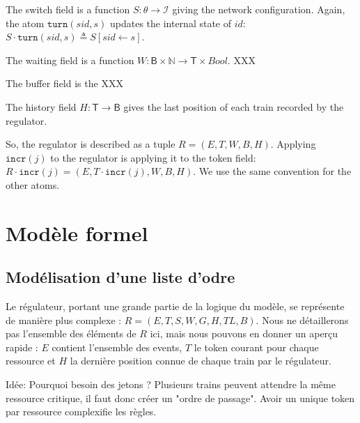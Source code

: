 \documentclass[runningheads]{llncs}
\newcommand{\Nat}{{\mbox{$\mathbb{N}$}}}
\newcommand{\turnouts}{{\mathsf{\theta}}}
\newcommand{\blocks}{{\mathsf{B}}}
\newcommand{\internalState}{{\mathcal{I}}}
\newcommand{\incr}{{\mbox{$\mathtt{incr}$}}\xspace}
\newcommand{\turn}{{\mbox{$\mathtt{turn}$}}\xspace}
\newcommand{\trains}{{\mathsf{T}}}
\begin{document}
The switch field is a function $S: \turnouts \to \internalState$ giving the network configuration. Again, the atom $\turn(sid,s)$ updates the internal state of $id$: $S \cdot \turn(sid,s) \triangleq S[sid \leftarrow s]$. 

The waiting field is a function $W: \blocks \times \Nat \to \trains \times Bool$. XXX

The buffer field is the XXX

The history field $H: \trains \to \blocks$ gives the last position of each train recorded  by the regulator. 

So, the regulator is described as a tuple $R = (E, T, W, B, H)$. Applying $\incr(j)$ to the regulator is applying it to the token field: $R \cdot \incr(j) = (E, T \cdot \incr(j), W, B, H)$. We use the same convention for the other atoms. 




\section{Modèle formel}
\label{sec:formal-model}

\subsection{Modélisation d'une liste d'odre}
Le régulateur, portant une grande partie de la logique du modèle, se représente de manière plus complexe : $R = (E,T,S,W,G,H,TL,B)$.
Nous ne détaillerons pas l'ensemble des éléments de $R$ ici, mais nous pouvons en donner un aperçu rapide : $E$ contient l'ensemble des events,
$T$ le token courant pour chaque ressource et $H$ la dernière position connue de chaque train par le régulateur.

Idée: Pourquoi besoin des jetons ? Plusieurs trains peuvent attendre la même ressource critique, il faut donc créer un "ordre de passage".
Avoir un unique token par ressource complexifie les règles.
\end{document}
